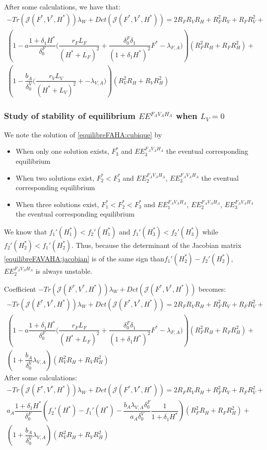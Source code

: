 \documentclass{article}
\newcommand{\lfa}{\lambda_{F, A}}
\newcommand{\lva}{\lambda_{V, A}}
\newcommand{\lfv}{\lambda_{W}}
\newcommand{\df}{\delta_0^F}
\newcommand{\dv}{\delta_0^V}
\begin{document}
\begin{itemize}
After some calculations, we have that:
\begin{multline}
-Tr(\mathcal{J}(F^*,V^*,H^*)) \lfv + Det(\mathcal{J}(F^*,V^*,H^*)) = 2 R_FR_VR_H + R_F^2R_V + R_FR_V^2 +  \\
\left(1 - a \dfrac{1 + \delta_1 H^*}{\df}\Big(\dfrac{r_F L_F}{(H^* + L_F)^2} + \dfrac{\df \delta_1}{(1+ \delta_1 H^*)^2}F^* - \lfa \Big)\right) \left(R_F^2R_H + R_FR_H^2\right) + \\
\left(1 - \dfrac{b_A}{\dv}\Big(\dfrac{r_V L_V}{(H^* + L_V)^2} + - \lva \Big)\right) \left(R_V^2R_H + R_VR_H^2\right) 
\end{multline}
\end{itemize}

\subsubsection{Study of stability of equilibrium $EE^{F_AV_AH_A}$ when $L_V = 0$}
We note the solution of \eqref{equilibreFAHA:cubique} by
\begin{itemize}
\item When only one solution exists, $F^*_3$ and $EE^{F_AV_AH_A}_3$ the eventual corresponding equilibrium
\item When two solutions exist, $F^*_2 < F^*_3$ and  $EE^{F_AV_AH_A}_2$, $EE^{F_AV_AH_A}_3$ the eventual corresponding equilibrium
\item When three solutions exist, $F_1^* < F^*_2 < F^*_3$ and $EE^{F_AV_AH_A}_1$,  $EE^{F_AV_AH_A}_2$, $EE^{F_AV_AH_A}_3$ the eventual corresponding equilibrium
\end{itemize}

We know that $f_1'(H^*_1) < f_2'(H^*_1)$ and $f_1'(H^*_3) < f_2'(H^*_3)$ while $f_2'(H^*_2) < f_1'(H^*_2)$. Thus, because the determinant of the Jacobian matrix \eqref{equilibreFAVAHA:jacobian} is of the same sign than$f_1'(H^*_2)-f_2'(H^*_2) $,  $EE^{F_AV_AH_A}_2$ is always unstable.

Coefficient $-Tr(\mathcal{J}(F^*,V^*,H^*)) \lfv + Det(\mathcal{J}(F^*,V^*,H^*))$ becomes:
\begin{multline}
-Tr(\mathcal{J}(F^*,V^*,H^*)) \lfv + Det(\mathcal{J}(F^*,V^*,H^*)) = 2 R_FR_VR_H + R_F^2R_V + R_FR_V^2 +  \\
\left(1 - a \dfrac{1 + \delta_1 H^*}{\df}\Big(\dfrac{r_F L_F}{(H^* + L_F)^2} + \dfrac{\df \delta_1}{(1+ \delta_1 H^*)^2}F^* - \lfa \Big)\right) \left(R_F^2R_H + R_FR_H^2\right) + \\
\left(1 + \dfrac{b_A}{\dv} \lva \right) \left(R_V^2R_H + R_VR_H^2\right) 
\end{multline}
After some calculations:
\begin{multline}
-Tr(\mathcal{J}(F^*,V^*,H^*)) \lfv + Det(\mathcal{J}(F^*,V^*,H^*)) = 2 R_FR_VR_H + R_F^2R_V + R_FR_V^2 +  \\
a_A \dfrac{1 + \delta_1 H^*}{\df} \left(f_2'(H^*) - f_1'(H^*) - \dfrac{b_A \lva \df}{a_A \dv} \dfrac{1}{1+\delta_1 H^*}\right) \left(R_F^2R_H + R_FR_H^2\right) + \\
\left(1 + \dfrac{b_A}{\dv} \lva \right) \left(R_V^2R_H + R_VR_H^2\right) 
\end{multline}
\end{document}
